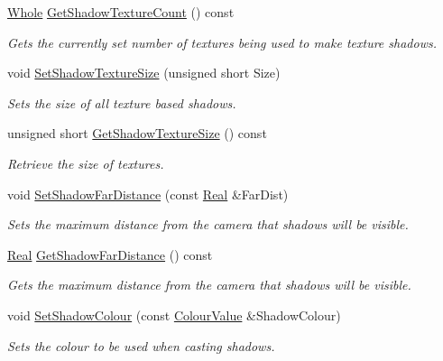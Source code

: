 \begin{DoxyCompactItemize}
\hyperlink{namespacephys_a460f6bc24c8dd347b05e0366ae34f34a}{Whole} \hyperlink{classphys_1_1SceneManager_ac5b37e84f72853b4705f164919e2daa3}{GetShadowTextureCount} () const 
\begin{DoxyCompactList}\small\item\em Gets the currently set number of textures being used to make texture shadows. \item\end{DoxyCompactList}\item 
void \hyperlink{classphys_1_1SceneManager_ab7022066631b9871f8d6e4da6aaa45ed}{SetShadowTextureSize} (unsigned short Size)
\begin{DoxyCompactList}\small\item\em Sets the size of all texture based shadows. \item\end{DoxyCompactList}\item 
unsigned short \hyperlink{classphys_1_1SceneManager_a0ed48ad404c48c492130f8f3f5eb2b26}{GetShadowTextureSize} () const 
\begin{DoxyCompactList}\small\item\em Retrieve the size of textures. \item\end{DoxyCompactList}\item 
void \hyperlink{classphys_1_1SceneManager_a124396e75cc26b400f08474a124b3fb3}{SetShadowFarDistance} (const \hyperlink{namespacephys_af7eb897198d265b8e868f45240230d5f}{Real} \&FarDist)
\begin{DoxyCompactList}\small\item\em Sets the maximum distance from the camera that shadows will be visible. \item\end{DoxyCompactList}\item 
\hyperlink{namespacephys_af7eb897198d265b8e868f45240230d5f}{Real} \hyperlink{classphys_1_1SceneManager_a496228d09b1ee83a6d476565cc334f3b}{GetShadowFarDistance} () const 
\begin{DoxyCompactList}\small\item\em Gets the maximum distance from the camera that shadows will be visible. \item\end{DoxyCompactList}\item 
void \hyperlink{classphys_1_1SceneManager_a5fae70a91407ed773541025f93c52342}{SetShadowColour} (const \hyperlink{classphys_1_1ColourValue}{ColourValue} \&ShadowColour)
\begin{DoxyCompactList}\small\item\em Sets the colour to be used when casting shadows. \item\end{DoxyCompactList}\item 

\end{DoxyCompactItemize}
